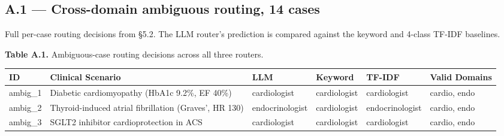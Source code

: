 \documentclass[
  american,
  a4paper,
]{article}
\begin{document}
\subsection{A.1 --- Cross-domain ambiguous routing, 14
cases}\label{a.1-cross-domain-ambiguous-routing-14-cases}

Full per-case routing decisions from §5.2. The LLM router's prediction
is compared against the keyword and 4-class TF-IDF baselines.

\textbf{Table A.1.} Ambiguous-case routing decisions across all three
routers.

\begin{longtable}[]{@{}
  >{\raggedright\arraybackslash}p{}
  >{\raggedright\arraybackslash}p{}
  >{\raggedright\arraybackslash}p{}
  >{\raggedright\arraybackslash}p{}
  >{\raggedright\arraybackslash}p{}
  >{\raggedright\arraybackslash}p{}@{}}
\toprule\noalign{}
\begin{minipage}[b]{\linewidth}\raggedright
ID
\end{minipage} & \begin{minipage}[b]{\linewidth}\raggedright
Clinical Scenario
\end{minipage} & \begin{minipage}[b]{\linewidth}\raggedright
LLM
\end{minipage} & \begin{minipage}[b]{\linewidth}\raggedright
Keyword
\end{minipage} & \begin{minipage}[b]{\linewidth}\raggedright
TF-IDF
\end{minipage} & \begin{minipage}[b]{\linewidth}\raggedright
Valid Domains
\end{minipage} \\
\midrule\noalign{}
\endhead
\bottomrule\noalign{}
\endlastfoot
ambig\_1 & Diabetic cardiomyopathy (HbA1c 9.2\%, EF 40\%) & cardiologist
& cardiologist & cardiologist & cardio, endo \\
ambig\_2 & Thyroid-induced atrial fibrillation (Graves', HR 130) &
endocrinologist & cardiologist & endocrinologist & cardio, endo \\
ambig\_3 & SGLT2 inhibitor cardioprotection in ACS & cardiologist &
cardiologist & cardiologist & cardio, endo \\

\end{longtable}
\end{document}
